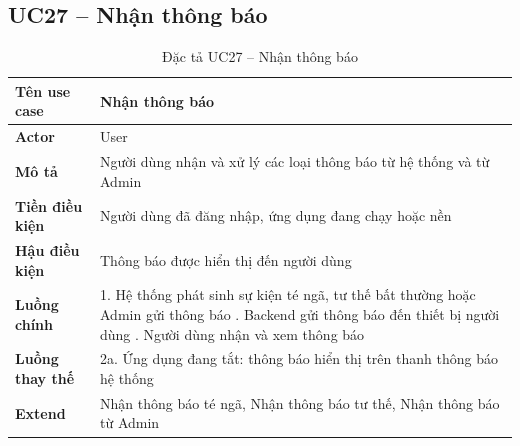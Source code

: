 \subsection*{UC27 -- Nhận thông báo}
\begin{table}[H]
    \captionsetup{justification=raggedright, singlelinecheck=false}
    \caption{Đặc tả UC27 -- Nhận thông báo}
\centering
\begin{tabular}{|p{3.5cm}|p{10cm}|}
\hline
\textbf{Tên use case} & Nhận thông báo \\
\hline
\textbf{Actor} & User \\
\hline
\textbf{Mô tả} & Người dùng nhận và xử lý các loại thông
  báo từ hệ thống và từ Admin \\
\hline
\textbf{Tiền điều kiện} & Người dùng đã đăng nhập, ứng dụng
  đang chạy hoặc nền \\
\hline
\textbf{Hậu điều kiện} & Thông báo được hiển thị đến
  người dùng \\
\hline
\textbf{Luồng chính} &
  1. Hệ thống phát sinh sự kiện té ngã, tư thế bất thường
     hoặc Admin gửi thông báo \newline
  2. Backend gửi thông báo đến thiết bị người dùng \newline
  3. Người dùng nhận và xem thông báo \\
\hline
\textbf{Luồng thay thế} &
  2a. Ứng dụng đang tắt: thông báo hiển thị
  trên thanh thông báo hệ thống \\
\hline
\textbf{Extend} & Nhận thông báo té ngã,
  Nhận thông báo tư thế,
  Nhận thông báo từ Admin \\
\hline
\end{tabular}

\end{table}

